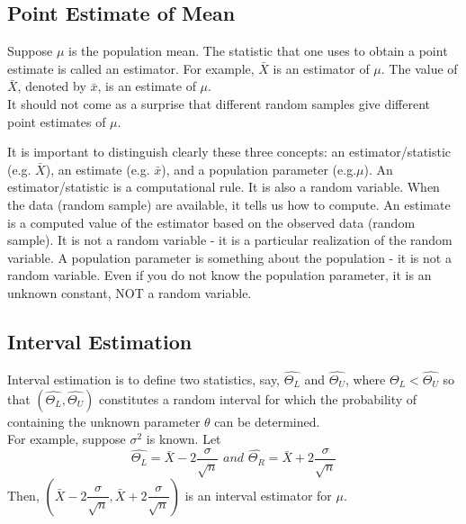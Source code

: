 \subsection{Point Estimate of Mean}
Suppose $\mu$ is the population mean. The statistic that one uses to obtain a point estimate is called an estimator. For example, $\bar{X}$ is an estimator of $\mu$. The value of $\bar{X}$, denoted by $\bar{x}$, is an estimate of $\mu$. \\
It should not come as a surprise that different random samples give different point estimates of $\mu$.
\begin{note}
\end{note}
It is important to distinguish clearly these three concepts: an estimator/statistic (e.g. $\bar{X}$), an estimate (e.g. $\bar{x}$), and a population parameter (e.g.$\mu$). An estimator/statistic is a computational rule. It is also a random variable. When the data (random sample) are available, it tells us how to compute. An estimate is a computed value of the estimator based on the observed data (random sample). It is not a random variable - it is a particular realization of the random variable. A population parameter is something about the population - it is not a random variable. Even if you do not know the population parameter, it is an unknown constant, NOT a random variable.

\subsection{Interval Estimation}
Interval estimation is to define two statistics, say, $\hat{\Theta_L}$ and $\hat{\Theta_U}$, where $\hat{\Theta_L} < \hat{\Theta_U}$ so that $(\hat{\Theta_L},\hat{\Theta_U})$ constitutes a random interval for which the probability of containing the unknown parameter $\theta$ can be determined. \\
For example, suppose $\sigma^2$ is known. Let
$$
\hat{\Theta_L} = \bar{X} - 2 \dfrac{\sigma}{\sqrt{n}} \textit{ and } \hat{\Theta_R} = \bar{X} + 2 \dfrac{\sigma}{\sqrt{n}}
$$
Then, $\left(\bar{X} - 2 \dfrac{\sigma}{\sqrt{n}}, \bar{X} + 2 \dfrac{\sigma}{\sqrt{n}} \right)$ is an interval estimator for $\mu$. 
